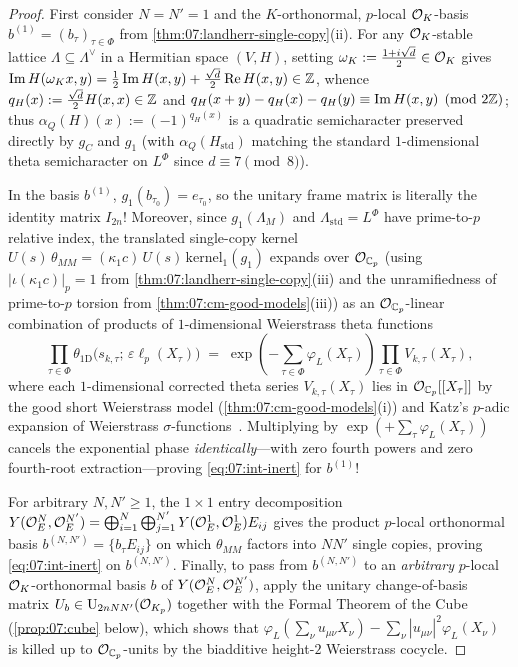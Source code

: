\begin{proof}
First consider $N = N' = 1$ and the $K$-orthonormal, $p$-local $\mathcal{O}_K$-basis $b^{(1)} = (b_\tau)_{\tau \in \Phi}$ from \cref{thm:07:landherr-single-copy}(ii). For any $\mathcal{O}_K$-stable lattice $\Lambda \subseteq \Lambda^\vee$ in a Hermitian space $(V, H)$, setting $\omega_K := \frac{1 + i\sqrt{d}}{2} \in \mathcal{O}_K$ gives $\operatorname{Im} H(\omega_K x, y) = \frac{1}{2}\operatorname{Im} H(x,y) + \frac{\sqrt{d}}{2}\operatorname{Re} H(x,y) \in \mathbb{Z}$, whence $q_H(x) := \frac{\sqrt{d}}{2}H(x,x) \in \mathbb{Z}$ and $q_H(x+y) - q_H(x) - q_H(y) \equiv \operatorname{Im} H(x, y) \pmod{2\mathbb{Z}}$; thus $\alpha_Q(H)(x) := (-1)^{q_H(x)}$ is a quadratic semicharacter preserved directly by $g_C$ and $g_1$ (with $\alpha_Q(H_{\mathrm{std}})$ matching the standard $1$-dimensional theta semicharacter on $L^\Phi$ since $d \equiv 7 \pmod 8$).

In the basis $b^{(1)}$, $g_1(b_{\tau_0}) = e_{\tau_0}$, so the unitary frame matrix is literally the identity matrix $I_{2n}$! Moreover, since $g_1(\Lambda_M)$ and $\Lambda_{\mathrm{std}} = L^\Phi$ have prime-to-$p$ relative index, the translated single-copy kernel $U(s)\,\theta_{MM} = (\kappa_1 c)\, U(s)\,\mathrm{kernel}_1(g_1)$ expands over $\mathcal{O}_{\mathbb{C}_p}$ (using $|\iota(\kappa_1 c)|_p = 1$ from \cref{thm:07:landherr-single-copy}(iii) and the unramifiedness of prime-to-$p$ torsion from \cref{thm:07:cm-good-models}(iii)) as an $\mathcal{O}_{\mathbb{C}_p}$-linear combination of products of $1$-dimensional Weierstrass theta functions
\[
  \prod_{\tau \in \Phi} \theta_{1\mathrm{D}}\bigl(s_{k,\tau};\, \varepsilon \ell_p(X_\tau)\bigr)
  \;=\; \exp\!\left(-\sum_{\tau \in \Phi} \varphi_L(X_\tau)\right) \prod_{\tau \in \Phi} V_{k,\tau}(X_\tau),
\]
where each $1$-dimensional corrected theta series $V_{k,\tau}(X_\tau)$ lies in $\mathcal{O}_{\mathbb{C}_p}[[X_\tau]]$ by the good short Weierstrass model (\cref{thm:07:cm-good-models}(i)) and Katz's $p$-adic expansion of Weierstrass $\sigma$-functions~\cite{Katz1976}. Multiplying by $\exp(+\sum_\tau \varphi_L(X_\tau))$ cancels the exponential phase \emph{identically}—with zero fourth powers and zero fourth-root extraction—proving \eqref{eq:07:int-inert} for $b^{(1)}$!

For arbitrary $N, N' \ge 1$, the $1 \times 1$ entry decomposition $Y(\mathcal{O}_E^N, \mathcal{O}_E^{N'}) = \bigoplus_{i=1}^N \bigoplus_{j=1}^{N'} Y(\mathcal{O}_E^1, \mathcal{O}_E^1) E_{ij}$ gives the product $p$-local orthonormal basis $b^{(N, N')} = \{b_\tau E_{ij}\}$ on which $\theta_{MM}$ factors into $N N'$ single copies, proving \eqref{eq:07:int-inert} on $b^{(N, N')}$. Finally, to pass from $b^{(N, N')}$ to an \emph{arbitrary} $p$-local $\mathcal{O}_K$-orthonormal basis $b$ of $Y(\mathcal{O}_E^N, \mathcal{O}_E^{N'})$, apply the unitary change-of-basis matrix $U_b \in \mathrm{U}_{2n N N'}(\mathcal{O}_{K_p})$ together with the Formal Theorem of the Cube (\cref{prop:07:cube} below), which shows that $\varphi_L(\sum_\nu u_{\mu\nu} X_\nu) - \sum_\nu |u_{\mu\nu}|^2 \varphi_L(X_\nu)$ is killed up to $\mathcal{O}_{\mathbb{C}_p}$-units by the biadditive height-$2$ Weierstrass cocycle.
\end{proof}

